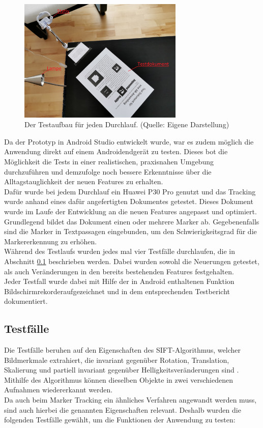 \begin{figure}[h!]
\centering
\includegraphics[width=0.7\textwidth]{Abbildungen/Testaufbau.jpeg}
\caption[Testaufbau]{Der Testaufbau für jeden Durchlauf. (Quelle: Eigene Darstellung)}
\label{fig:Testaufbau}
\end{figure}

Da der Prototyp in Android Studio entwickelt wurde, war es zudem möglich die Anwendung direkt auf einem Androidendgerät zu testen. Dieses bot die Möglichkeit die Tests in einer realistischen, praxisnahen Umgebung durchzuführen und demzufolge noch bessere Erkenntnisse über die Alltagstauglichkeit der neuen Features zu erhalten.  \\
Dafür wurde bei jedem Durchlauf ein Huawei P30 Pro genutzt und das Tracking wurde anhand eines dafür angefertigten Dokumentes  getestet. Dieses Dokument wurde im Laufe der Entwicklung an die neuen Features angepasst und optimiert. Grundlegend bildet das Dokument einen oder mehrere Marker ab. Gegebenenfalls sind die Marker in Textpassagen eingebunden, um den Schwierigkeitsgrad für die Markererkennung zu erhöhen.\\
Während des Testlaufs wurden jedes mal vier Testfälle durchlaufen, die in Abschnitt \ref{sec:Testfälle} beschrieben werden. Dabei wurden sowohl die Neuerungen getestet, als auch Veränderungen in den bereits bestehenden Features festgehalten.\\
Jeder Testfall wurde dabei mit Hilfe der in Android enthaltenen Funktion \glqq Bildschirmrekorder\grqq aufgezeichnet und in dem entsprechenden Testbericht dokumentiert.


\subsection{Testfälle}\label{sec:Testfälle}
Die Testfälle beruhen auf den Eigenschaften des SIFT-Algorithmus, welcher Bildmerkmale extrahiert, die invariant gegenüber Rotation, Translation, Skalierung und partiell invariant gegenüber Helligkeitsveränderungen sind \citep[S. 345]{nischwitz:bildverarbeitung}. Mithilfe des Algorithmus können dieselben Objekte in zwei verschiedenen Aufnahmen wiedererkannt werden.\\
Da auch beim Marker Tracking ein ähnliches Verfahren angewandt werden muss, sind auch hierbei die genannten Eigenschaften relevant. Deshalb wurden die folgenden Testfälle gewählt, um die Funktionen der Anwendung zu testen:

